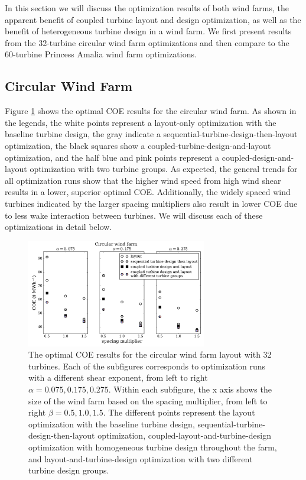 \documentclass[WESD, manuscript]{copernicus}
\begin{document}
In this section we will discuss the optimization results of both wind farms, the apparent benefit of coupled turbine layout and design optimization, as well as the benefit of heterogeneous turbine design in a wind farm.
We first present results from the 32-turbine circular wind farm optimizations and then compare to the 60-turbine Princess Amalia wind farm optimizations. 


\subsection{Circular Wind Farm}

Figure \ref{circular_results} shows the optimal COE results for the circular wind farm. As shown in the legends, the white points represent a layout-only optimization with the baseline turbine design, the gray indicate a sequential-turbine-design-then-layout optimization, the black squares show a coupled-turbine-design-and-layout optimization, and the half blue and pink points represent a coupled-design-and-layout optimization with two turbine groups.  As expected, the general trends for all optimization runs show that the higher wind speed from high wind shear results in a lower, superior optimal COE. Additionally, the widely spaced wind turbines indicated by the larger spacing multipliers also result in lower COE due to less wake interaction between turbines. We will discuss each of these optimizations in detail below.


\begin{figure}[htbp]
  \centering
  \includegraphics[width=0.7\textwidth]{Figures/circular_results1.pdf}
  \caption{\label{circular_results} The optimal COE results for the circular wind farm layout with 32 turbines. Each of the subfigures corresponds to optimization runs with a different shear exponent, from left to right $\alpha=0.075,0.175,0.275$. Within each subfigure, the x axis shows the size of the wind farm based on the spacing multiplier, from left to right $\beta=0.5,1.0,1.5$. The different points represent the layout optimization with the baseline turbine design, sequential-turbine-design-then-layout optimization, coupled-layout-and-turbine-design optimization with homogeneous turbine design throughout the farm, and layout-and-turbine-design optimization with two different turbine design groups.}
\end{figure}
\end{document}
